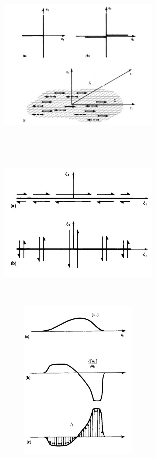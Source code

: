 \documentclass{beamer}
\begin{document}
\begin{frame}
	\begin{figure}[htb]
		\centering
		\includegraphics[width= 8cm, height= 8cm]{diagramas}
	\end{figure}
\end{frame}

\begin{frame}
	\begin{figure}[htb]
		\centering
		\includegraphics[width= 8cm, height= 8cm]{distribuicao}
	\end{figure}
\end{frame}

\begin{frame}
	\begin{figure}[htb]
		\centering
		\includegraphics[width= 8cm, height= 8cm]{terceira}
	\end{figure}
\end{frame}
\end{document}
